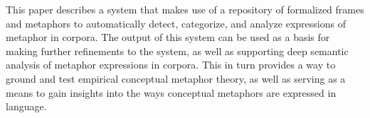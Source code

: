 This paper describes a system that makes use of a repository of formalized frames and metaphors to automatically detect, categorize, and analyze expressions of metaphor in corpora.  The output of this system can be used as a basis for making further refinements to the system, as well as supporting deep semantic analysis of metaphor expressions in corpora. This in turn provides a way to ground and test empirical conceptual metaphor theory, as well as serving as a means to gain insights into the ways conceptual metaphors are expressed in language.

